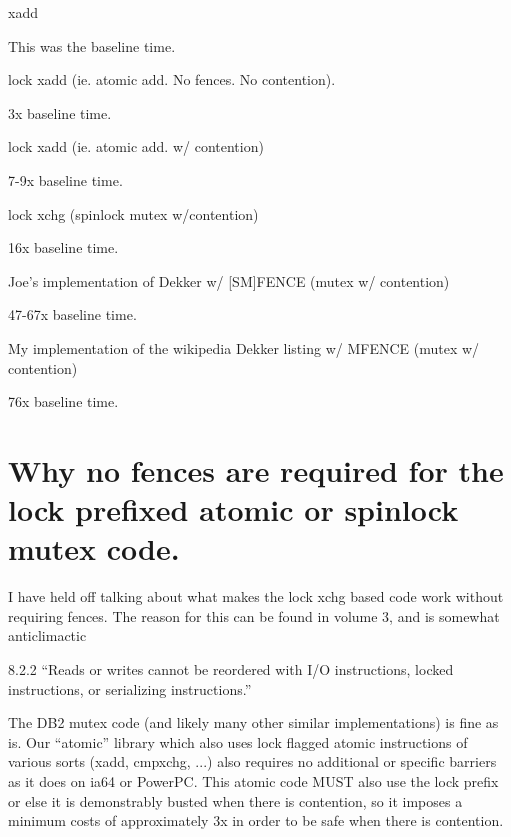 \begin{itemize}
\begin{item}
xadd

This was the baseline time.
\end{item}
\begin{item}
lock xadd (ie. atomic add.  No fences.  No contention).

3x baseline time.
\end{item}

\begin{item}
lock xadd (ie. atomic add.  w/ contention)

7-9x baseline time.
\end{item}

\begin{item}
lock xchg (spinlock mutex w/contention)

16x baseline time.
\end{item}

\begin{item}
Joe's implementation of Dekker w/ [SM]FENCE (mutex w/ contention)

47-67x baseline time.
\end{item}

\begin{item}
My implementation of the wikipedia Dekker listing w/ MFENCE (mutex w/ contention)

76x baseline time.
\end{item}
\end{itemize}

\section{Why no fences are required for the lock prefixed atomic or spinlock mutex code.}

I have held off talking about what makes the lock xchg based code work without requiring fences.  The reason for this can be found in volume 3, and is somewhat anticlimactic

8.2.2 ``Reads or writes cannot be reordered with I/O instructions, locked instructions, or serializing instructions.''

The DB2 mutex code (and likely many other similar implementations) is fine as is.  Our ``atomic'' library which also uses lock flagged atomic instructions of various sorts (xadd, cmpxchg, ...) also requires no additional or specific barriers as it does on ia64 or PowerPC.  This atomic code MUST also use the lock prefix or else it is demonstrably busted when there is contention, so it imposes a minimum costs of approximately 3x in order to be safe when there is contention.

